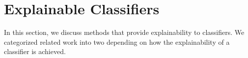 \chapter{Explainable Classifiers}\label{sec-explainable-classifier}

In this section, we discuss methods that provide explainability to classifiers. We categorized related work into two depending on how the explainability of a classifier is achieved. 







